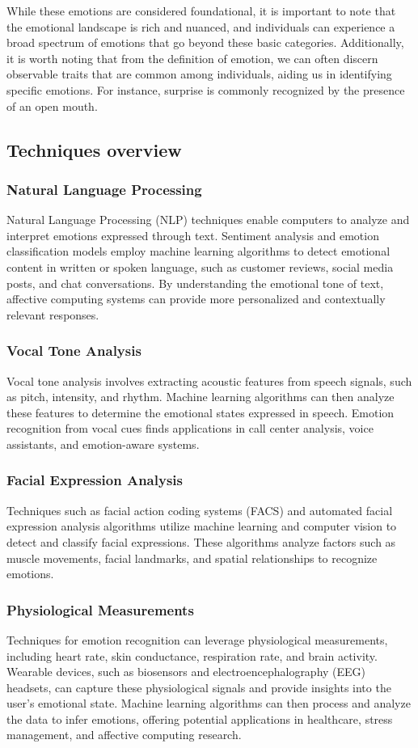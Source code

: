 While these emotions are considered foundational, it is important to note that the emotional landscape is rich and nuanced, and individuals can experience
a broad spectrum of emotions that go beyond these basic categories. 
Additionally, it is worth noting that from the definition of emotion, we can often discern observable traits that are common among individuals, aiding us in identifying specific emotions.
For instance, surprise is commonly recognized by the presence of an open mouth.

\subsection{Techniques overview}

\subsubsection{Natural Language Processing}
Natural Language Processing (NLP) techniques enable computers to analyze and interpret emotions expressed through text.
Sentiment analysis and emotion classification models employ machine learning algorithms to detect emotional content in written or spoken language, such as customer reviews, 
 social media posts, and chat conversations.
By understanding the emotional tone of text, affective computing systems can provide more personalized and contextually relevant responses.
\subsubsection{Vocal Tone Analysis}
Vocal tone analysis involves extracting acoustic features from speech signals, such as pitch, intensity, and rhythm. 
Machine learning algorithms can then analyze these features to determine the emotional states expressed in speech.
Emotion recognition from vocal cues finds applications in call center analysis, voice assistants, and emotion-aware systems.
\subsubsection{Facial Expression Analysis}
Techniques such as facial action coding systems (FACS) and automated facial expression analysis algorithms utilize machine learning and 
computer vision to detect and classify facial expressions. 
These algorithms analyze factors such as muscle movements, facial landmarks, and spatial relationships to recognize emotions.
\subsubsection{Physiological Measurements}\label{sec:physiological-measurements}
Techniques for emotion recognition can leverage physiological measurements, including heart rate, skin conductance, respiration rate, and brain activity. 
Wearable devices, such as biosensors and electroencephalography (EEG) headsets, can capture these physiological signals and provide insights into the user's emotional state. 
Machine learning algorithms can then process and analyze the data to infer emotions, offering potential applications in healthcare, stress management, and affective computing research.
